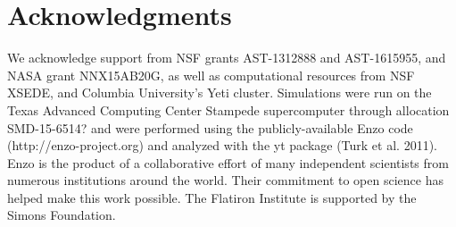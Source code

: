 \documentclass[useAMS,usenatbib]{mn2e}
\begin{document}
% 
\section*{Acknowledgments}

We acknowledge support from NSF grants AST-1312888 and AST-1615955, and NASA grant NNX15AB20G, as well as computational resources from NSF XSEDE,
and Columbia University's Yeti cluster. Simulations were run on the Texas Advanced Computing Center Stampede supercomputer through allocation SMD-15-6514? and were performed
using the publicly-available Enzo code (http://enzo-project.org) and analyzed with the yt package (Turk et al. 2011). Enzo is the product of a
collaborative effort of many independent scientists from numerous institutions around the world. Their commitment to open science has helped make
this work possible. The Flatiron Institute is supported by the Simons Foundation. 


%
\end{document}
